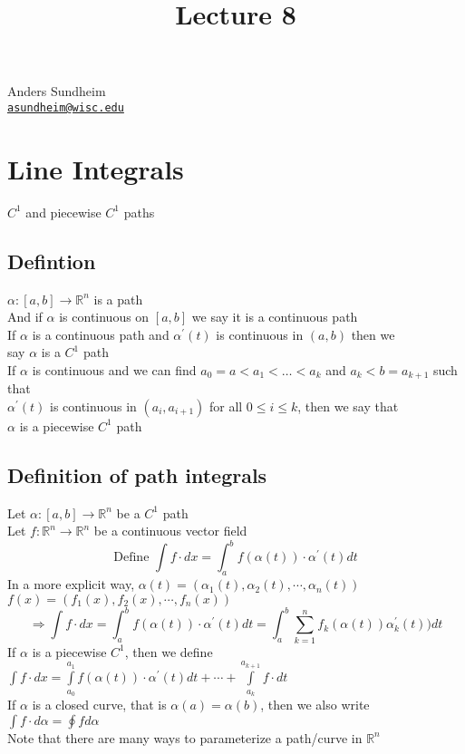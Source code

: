 \documentclass[12pt]{article}
\title{Lecture 8}
\newcommand*\circled[1]{\tikz[baseline=(char.base)]{
    \node[shape=circle,draw,inner sep=2pt] (char) {#1};}}
\newcommand{\BR}{\mathbb R}
\newcommand{\prm}{^\prime}
\begin{document}
\maketitle
\vspace*{-0.25in}
\begin{center}
	Anders Sundheim \\
	\href{mailto:asundheim@wisc.edu}{{\tt asundheim@wisc.edu}}
\end{center}
\section*{Line Integrals}
$C^1$ and piecewise $C^1$ paths
\subsection*{Defintion}
$\alpha:[a,b]\rightarrow\BR^n$ is a path \\
And if $\alpha$ is continuous on $[a,b]$ we say it is a continuous path \\
If $\alpha$ is a continuous path and $\alpha\prm(t)$ is continuous in $(a,b)$ then we \\
say $\alpha$ is a $C^1$ path \\
If $\alpha$ is continuous and we can find $a_0=a<a_1<\dots<a_k$ and $a_k<b=a_{k+1}$ such that \\
$\alpha\prm(t)$ is continuous in $(a_i,a_{i+1})$ for all $0\leq i\leq k$, then we say that \\
$\alpha$ is a piecewise $C^1$ path \\
\subsection*{Definition of path integrals}
  \circled{1} Let $\alpha:[a,b]\rightarrow\BR^n$ be a $C^1$ path \\
  Let $f:\BR^n\rightarrow\BR^n$ be a continuous vector field \\
  \[ \text{Define }\int f\cdot dx=\int_a^bf(\alpha(t))\cdot\alpha\prm(t)dt \]
  In a more explicit way, $\alpha(t)=(\alpha_1(t),\alpha_2(t),\cdots,\alpha_n(t))$ \\
  $f(x) = (f_1(x), f_2(x),\cdots,f_n(x))$ \\
  \[ \Rightarrow\int f\cdot dx=\int_a^b f(\alpha(t))\cdot\alpha\prm(t)dt=\int_a^b\sum_{k=1}^nf_k(\alpha(t))\alpha\prm_k(t))dt \]
  \circled{2} If $\alpha$ is a piecewise $C^1$, then we define $\int f\cdot dx=\int\limits_{a_0}^{a_1}f(\alpha(t))\cdot\alpha\prm(t)dt+\cdots+\int\limits_{a_k}^{a_{k+1}}f\cdot dt$ \\
  \circled{3} If $\alpha$ is a closed curve, that is $\alpha(a)=\alpha(b)$, then we also write $\int f\cdot d\alpha=\oint fd\alpha$ \\
  Note that there are many ways to parameterize a path/curve in $\BR^n$ \\
\end{document}
